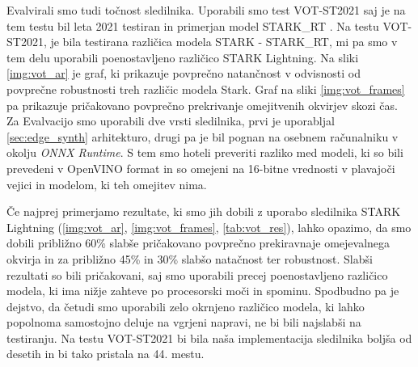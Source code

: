 \documentclass[a4paper,12pt,openright]{book}
\begin{document}
Evalvirali smo tudi točnost sledilnika. Uporabili smo test VOT-ST2021 \cite{vot2021} saj je na tem testu bil leta 2021 testiran in primerjan model STARK\_RT \cite{stark}. Na testu VOT-ST2021, je bila testirana različica modela STARK - STARK\_RT, mi pa smo v tem delu uporabili poenostavljeno različico STARK Lightning. Na sliki \ref{img:vot_ar} je graf, ki prikazuje povprečno natančnost v odvisnosti od povprečne robustnosti treh različic modela Stark. Graf na sliki \ref{img:vot_frames} pa prikazuje pričakovano povprečno prekrivanje omejitvenih okvirjev skozi čas. Za Evalvacijo smo uporabili dve vrsti sledilnika, prvi je uporabljal \ref{sec:edge_synth} arhitekturo, drugi pa je bil pognan na osebnem računalniku v okolju \emph{ONNX Runtime}. S tem smo hoteli preveriti razliko med modeli, ki so bili prevedeni v OpenVINO format in so omejeni na 16-bitne vrednosti v plavajoči vejici in modelom, ki teh omejitev nima.

Če najprej primerjamo rezultate, ki smo jih dobili z uporabo sledilnika STARK Lightning (\ref{img:vot_ar}, \ref{img:vot_frames}, \ref{tab:vot_res}), lahko opazimo, da smo dobili približno 60\% slabše pričakovano povprečno prekiravnaje omejevalnega okvirja in za približno 45\% in 30\% slabšo natačnost ter robustnost. Slabši rezultati so bili pričakovani, saj smo uporabili precej poenostavljeno različico modela, ki ima nižje zahteve po procesorski moči in spominu. Spodbudno pa je dejstvo, da četudi smo uporabili zelo okrnjeno različico modela, ki lahko popolnoma samostojno deluje na vgrjeni napravi, ne bi bili najslabši na testiranju. Na testu VOT-ST2021 bi bila naša implementacija sledilnika boljša od desetih in bi tako pristala na 44. mestu.
\end{document}
